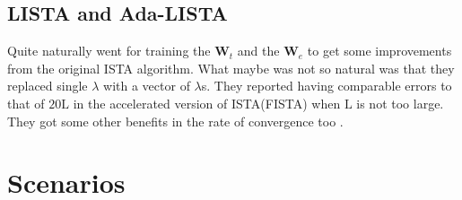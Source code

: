 \subsection{LISTA and Ada-LISTA}

Quite naturally \cite{Gregor2010} went for training the $\boldsymbol{W}_t$ and the $\boldsymbol{W}_e$ to get some improvements 
from the original \ac{ISTA}\cite{Daubechies2003} algorithm. What maybe was not so natural was that they replaced single $\lambda$ with a vector of $\lambda$s. 
They reported having comparable errors to that of $20\mathrm{L}$ in the accelerated version of \ac{ISTA}\cite{Daubechies2003}(\ac{FISTA}\cite{Beck2009})
when $\mathrm{L}$ is not too large. They got some other benefits in the rate of convergence too \cite{Daubechies2003}\cite{Beck2009}\cite{Gregor2010}. 


\section{Scenarios}

